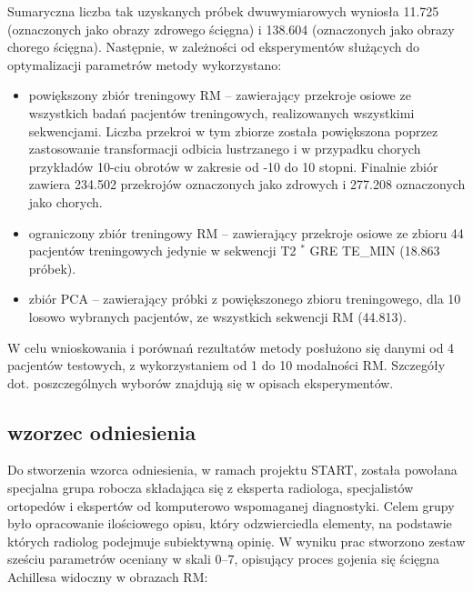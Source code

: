 Sumaryczna liczba tak uzyskanych próbek dwuwymiarowych wyniosła 11.725 (oznaczonych jako obrazy zdrowego ścięgna) i 138.604 (oznaczonych jako obrazy chorego ścięgna). Następnie, w zależności od eksperymentów służących do optymalizacji parametrów metody wykorzystano:
\begin{itemize}
	\item powiększony zbiór treningowy RM -- zawierający przekroje osiowe ze wszystkich badań pacjentów treningowych, realizowanych wszystkimi sekwencjami. Liczba przekroi w tym zbiorze została powiększona poprzez zastosowanie transformacji odbicia lustrzanego i w przypadku chorych przykładów 10-ciu obrotów w zakresie od -10 do 10 stopni. Finalnie zbiór zawiera 234.502 przekrojów oznaczonych jako zdrowych i 277.208 oznaczonych jako chorych.
	\item ograniczony zbiór treningowy RM -- zawierający przekroje osiowe ze zbioru 44 pacjentów treningowych jedynie w sekwencji T2 $^\ast$ GRE TE\_MIN (18.863 próbek).
	\item zbiór PCA -- zawierający próbki z powiększonego zbioru treningowego, dla 10 losowo wybranych pacjentów, ze wszystkich sekwencji RM (44.813).
\end{itemize}

W celu wnioskowania i porównań rezultatów metody posłużono się danymi od 4 pacjentów testowych, z wykorzystaniem od 1 do 10 modalności RM. Szczegóły dot. poszczególnych wyborów znajdują się w opisach eksperymentów.


\subsection{wzorzec odniesienia}
\label{seq:ground-truth}
Do stworzenia wzorca odniesienia, w ramach projektu START, została powołana specjalna grupa robocza składająca się z eksperta radiologa, specjalistów ortopedów i ekspertów od komputerowo wspomaganej diagnostyki. Celem grupy było opracowanie ilościowego opisu, który odzwierciedla elementy, na podstawie których radiolog podejmuje subiektywną opinię. W wyniku prac stworzono zestaw sześciu parametrów oceniany w skali 0--7, opisujący proces gojenia się ścięgna Achillesa widoczny w obrazach RM:

